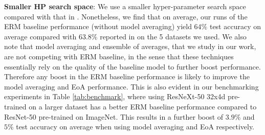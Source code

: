 \textbf{Smaller HP search space}: We use a smaller hyper-parameter search space compared with that in \cite{gulrajani2020search}. Nonetheless, we find that on average, our runs of the ERM baseline performance (without model averaging) yield $64\%$ test accuracy on average compared with $63.8\%$ reported in \cite{gulrajani2020search} on the 5 datasets we used. We also note that model averaging and ensemble of averages, that we study in our work, are not competing with ERM baseline, in the sense that these techniques essentially rely on the quality of the baseline model to further boost performance. Therefore any boost in the ERM baseline performance is likely to improve the model averaging and EoA performance. This is also evident in our benchmarking experiments in Table \ref{tab:benchmark}, where using ResNeXt-50 32x4d pre-trained on a larger dataset \cite{yalniz2019billion} has a better ERM baseline performance compared to ResNet-50 pre-trained on ImageNet. This results in a further boost of $3.9\%$ and $5\%$ test accuracy on average when using model averaging and EoA respectively.





